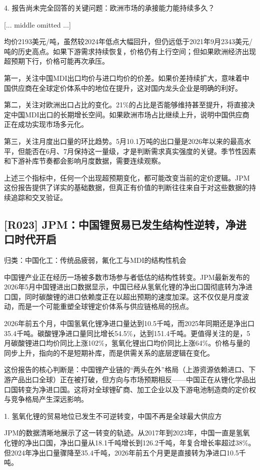 \documentclass[11pt]{ctexart}
\begin{document}
4. 报告尚未完全回答的关键问题：欧洲市场的承接能力能持续多久？



[... middle omitted ...]

均价2193美元/吨，虽然较2024年低点大幅回升，但仍远低于2021年9月2343美元/吨的历史高点。如果下游需求持续恢复，价格仍有上行空间；但如果欧洲经济出现超预期下行，价格可能再次承压。

第一，关注中国MDI出口均价与进口均价的价差。如果价差持续扩大，意味着中国供应商在全球定价体系中的地位在提升，这对国内龙头企业是明确的利好。

第二，关注对欧洲出口占比的变化。21\%的占比是否能够维持甚至提升，将直接决定中国MDI出口的长期增长空间。如果欧洲市场占比继续上升，说明中国供应商正在成功实现市场多元化。

第三，关注月度出口量的环比趋势。5月10.1万吨的出口量是2026年以来的最高水平，但能否在6月、7月保持这一量级，才是判断需求真实强度的关键。季节性因素和下游补库节奏都会影响月度数据，需要连续观察。

上述三个指标中，任何一个出现超预期变化，都可能改变当前的定价逻辑。JPM这份报告提供了详实的基础数据，但真正有价值的判断往往来自于对这些数据的持续追踪和交叉验证。

\subsection{[R023] JPM：中国锂贸易已发生结构性逆转，净进口时代开启}
{\small\color{refgray}归类：中国化工：传统品疲弱，氟化工与MDI的结构性机会}

中国锂产业正在经历一场被多数市场参与者低估的结构性转变。JPM最新发布的2026年5月中国锂进出口数据显示，中国已经从氢氧化锂的净出口国彻底转为净进口国，同时碳酸锂的进口依赖度正在以超出预期的速度加深。这不仅仅是月度波动，而是一个可能重塑全球锂定价体系与供应链格局的拐点。

2026年前五个月，中国氢氧化锂净进口量达到10.5千吨，而2025年同期还是净出口35.4千吨。碳酸锂净进口量同比增长54.5\%，达到151.4千吨。更值得关注的是，5月碳酸锂进口均价同比上涨102\%，氢氧化锂出口均价同比上涨64\%。价格与量的同步上升，指向的不是短期补库，而是供需关系的底层逻辑在变化。

这份报告的核心判断是：中国锂产业链的“两头在外”格局（上游资源依赖进口、下游产品出口全球）正在被打破，但方向与市场预期相反——中国正在从锂化学品出口国转变为净进口国。这将对全球锂矿商、加工企业以及下游电池制造商的定价权与竞争格局产生深远影响。

1. 氢氧化锂的贸易地位已发生不可逆转变，中国不再是全球最大供应方

JPM的数据清晰地展示了这一转变的轨迹。从2017年到2023年，中国一直是氢氧化锂的净出口国，净出口量从18.1千吨增长到126.2千吨，年复合增长率超过38\%。但2024年净出口量骤降至35.4千吨，2026年前五个月更是直接转为净进口10.5千吨。
\end{document}
